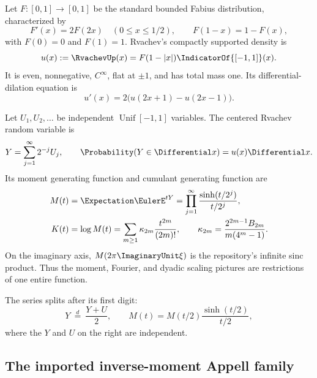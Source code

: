 \documentclass[11pt,a4paper]{article}
\theoremstyle{definition}
\theoremstyle{remark}
\begin{document}
Let $F:[0,1]\to[0,1]$ be the standard bounded Fabius distribution, characterized by
\begin{equation}
 F'(x)=2F(2x)\quad(0\le x\le1/2),
 \qquad F(1-x)=1-F(x),
 \label{eq:Fabius-basic}
\end{equation}
with $F(0)=0$ and $F(1)=1$. Rvachev's compactly supported density is
\begin{equation}
 u(x):=\RvachevUp(x)=F(1-|x|)\IndicatorOf{[-1,1]}(x).
 \label{eq:up-F}
\end{equation}
It is even, nonnegative, $C^\infty$, flat at $\pm1$, and has total mass one. Its differential-dilation equation is
\begin{equation}
 u'(x)=2\bigl(u(2x+1)-u(2x-1)\bigr).
 \label{eq:up-dde}
\end{equation}

Let $U_1,U_2,\ldots$ be independent $\operatorname{Unif}[-1,1]$ variables. The centered Rvachev random variable is
\begin{equation}
 Y=\sum_{j=1}^{\infty}2^{-j}U_j,
 \qquad \Probability(Y\in\Differential x)=u(x)\Differential x.
 \label{eq:Y-series}
\end{equation}
Its moment generating function and cumulant generating function are
\begin{align}
 M(t)&=\Expectation\EulerE^{tY}
 =\prod_{j=1}^{\infty}\frac{\sinh(t/2^j)}{t/2^j},
 \label{eq:M-product}\\
 K(t)&=\log M(t)
 =\sum_{m\ge1}\kappa_{2m}\frac{t^{2m}}{(2m)!},
 \qquad
 \kappa_{2m}=\frac{2^{2m-1}B_{2m}}{m(4^m-1)}.
 \label{eq:cumulants}
\end{align}
On the imaginary axis, $M(2\pi\ImaginaryUnit\xi)$ is the repository's infinite sinc product. Thus the moment, Fourier, and dyadic scaling pictures are restrictions of one entire function.

The series splits after its first digit:
\begin{equation}
 Y\ \stackrel d=\ \frac{Y+U}{2},
 \qquad
 M(t)=M(t/2)\frac{\sinh(t/2)}{t/2},
 \label{eq:fixedpoint}
\end{equation}
where the $Y$ and $U$ on the right are independent.

\subsection{The imported inverse-moment Appell family}
\end{document}
